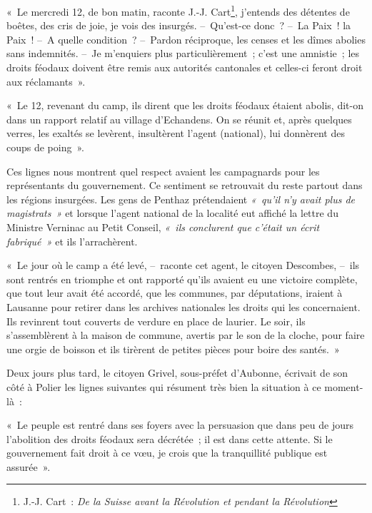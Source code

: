 \documentclass[french,twoside]{book} %
\newenvironment{quoteblock}%
  {\begin{quoting}}
  {\end{quoting}}
\newenvironment{quotebar}{%
    \def\FrameCommand{{\color{rubric!10!}\vrule width 0.5em} \hspace{0.9em}}%
    \def\OuterFrameSep{\itemsep} %
    \MakeFramed {\advance\hsize-\width \FrameRestore}
  }%
  {%
    \endMakeFramed
  }
\renewenvironment{quoteblock}%
  {%
    \savenotes
    \setstretch{0.9}
    \normalfont
    \begin{quotebar}
  }
  {%
    \end{quotebar}
    \spewnotes
  }
\begin{document}
\begin{quoteblock}
 \noindent « Le mercredi 12, de bon matin, raconte J.-J. Cart\footnote{J.-J. Cart : \emph{De la Suisse avant la Révolution et pendant la Révolution}}, j’entends des détentes de boêtes, des cris de joie, je vois des insurgés. – Qu’est-ce donc ? – La Paix ! la Paix ! – A quelle condition ? – Pardon réciproque, les censes et les dîmes abolies sans indemnités. – Je m’enquiers plus particulièrement ; c’est une amnistie ; les droits féodaux doivent être remis aux autorités cantonales et celles-ci feront droit aux réclamants ».\par
 « Le 12, revenant du camp, ils dirent que les droits féodaux étaient abolis, dit-on dans un rapport relatif au village d’Echandens. On se réunit et, après quelques verres, les exaltés se levèrent, insultèrent l’agent (national), lui donnèrent des coups de poing ».
 \end{quoteblock}

\noindent Ces lignes nous montrent quel respect avaient les campagnards pour les représentants du gouvernement. Ce sentiment se retrouvait du reste partout dans les régions insurgées. Les gens de Penthaz prétendaient \emph{« qu’il n’y avait plus de magistrats »} et lorsque l’agent national de la localité eut affiché la lettre du Ministre Verninac au Petit Conseil, \emph{« ils conclurent que c’était un écrit fabriqué »} et ils l’arrachèrent.\par

\begin{quoteblock}
 \noindent « Le jour où le camp a été levé, – raconte cet agent, le citoyen Descombes, – ils sont rentrés en triomphe et ont rapporté qu’ils avaient eu une victoire complète, que tout leur avait été accordé, que les communes, par députations, iraient à Lausanne pour retirer dans les archives nationales les droits qui les concernaient. Ils revinrent tout couverts de verdure en place de laurier. Le soir, ils s’assemblèrent à la maison de commune, avertis par le son de la cloche, pour faire une orgie de boisson et ils tirèrent de petites pièces pour boire des santés. »
 \end{quoteblock}

\noindent Deux jours plus tard, le citoyen Grivel, sous-préfet d’Aubonne, écrivait de son côté à Polier les lignes suivantes qui résument très bien la situation à ce moment-là :\par

\begin{quoteblock}
 \noindent « Le peuple est rentré dans ses foyers avec la persuasion que dans peu de jours l’abolition des droits féodaux sera décrétée ; il est dans cette attente. Si le gouvernement fait droit à ce vœu, je crois que la tranquillité publique est assurée ».
 \end{quoteblock}
\end{document}
